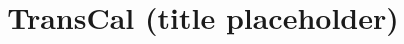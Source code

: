 \documentclass[sigplan,review,anonymous,acmsmall]{acmart}
\begin{document}
\title{TransCal (title placeholder)}




\clearpage


\end{document}
